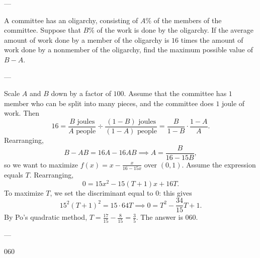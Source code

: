 
---

A committee has an oligarchy, consisting of $A\%$ of the members of the committee. Suppose that $B\%$ of the work is done by the oligarchy. If the average amount of work done by a member of the oligarchy is $16$ times the amount of work done by a nonmember of the oligarchy, find the maximum possible value of $B-A$.

---

Scale $A$ and $B$ down by a factor of $100$. Assume that the committee has $1$ member who can be split into many pieces, and the committee does $1$ joule of work. Then\[16=\frac{B\text{ joules}}{A\text{ people}}\div\frac{(1-B)\text{ joules}}{(1-A)\text{ people}}=\frac B{1-B}\cdot\frac{1-A}A.\]Rearranging,\[B-AB=16A-16AB\implies A=\frac B{16-15B},\]so we want to maximize $f(x)=x-\tfrac x{16-15x}$ over $(0,1)$. Assume the expression equals $T$. Rearranging,\[0=15x^2-15(T+1)x+16T.\]To maximize $T$, we set the discriminant equal to $0$: this gives\[15^2(T+1)^2=15\cdot64T\implies0=T^2-\frac{34}{15}T+1.\]By Po's quadratic method, $T=\tfrac{17}{15}-\tfrac8{15}=\tfrac35$. The answer is $060$.


---

060
